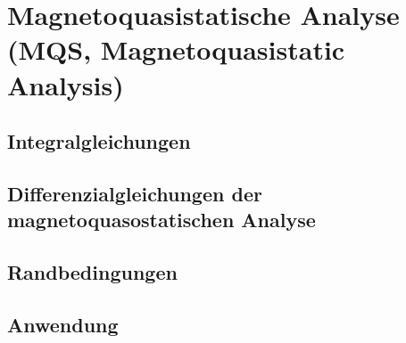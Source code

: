 \section{Magnetoquasistatische Analyse (MQS, Magnetoquasistatic Analysis)}
\subsection{Integralgleichungen}
\subsection{Differenzialgleichungen der magnetoquasostatischen Analyse}
\subsection{Randbedingungen}
\subsection{Anwendung}
\clearpage
\pagebreak